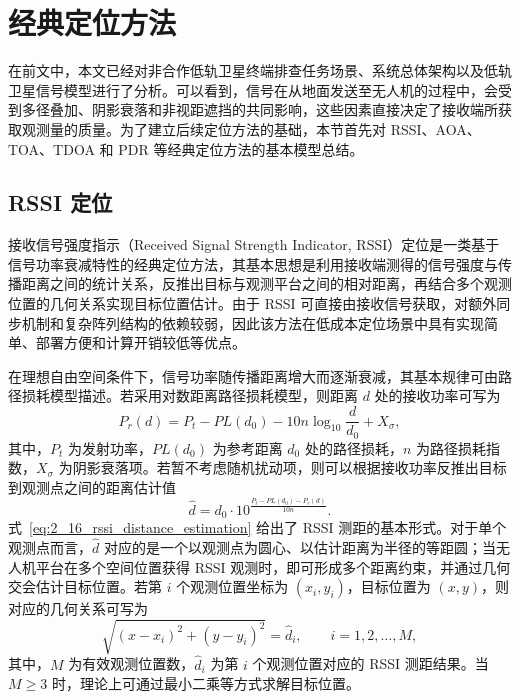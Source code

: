 \section{经典定位方法}
\label{sec:2_3}

在前文中，本文已经对非合作低轨卫星终端排查任务场景、系统总体架构以及低轨卫星信号模型进行了分析。可以看到，信号在从地面发送至无人机的过程中，会受到多径叠加、阴影衰落和非视距遮挡的共同影响，这些因素直接决定了接收端所获取观测量的质量。为了建立后续定位方法的基础，本节首先对 RSSI、AOA、TOA、TDOA 和 PDR 等经典定位方法的基本模型总结\cite{Torrieri1984PassiveLocation,Wymeersch2009CooperativeLocalization}。

\subsection{RSSI 定位}
\label{subsec:2_3_1}

接收信号强度指示（Received Signal Strength Indicator, RSSI）定位是一类基于信号功率衰减特性的经典定位方法，其基本思想是利用接收端测得的信号强度与传播距离之间的统计关系，反推出目标与观测平台之间的相对距离，再结合多个观测位置的几何关系实现目标位置估计。由于 RSSI 可直接由接收信号获取，对额外同步机制和复杂阵列结构的依赖较弱，因此该方法在低成本定位场景中具有实现简单、部署方便和计算开销较低等优点。

在理想自由空间条件下，信号功率随传播距离增大而逐渐衰减，其基本规律可由路径损耗模型描述。若采用对数距离路径损耗模型，则距离 $d$ 处的接收功率可写为
\begin{equation}
P_r(d)
=
P_t
-
PL(d_0)
-
10n\log_{10}\frac{d}{d_0}
+
X_{\sigma},
\label{eq:2_15_rssi_pathloss_model}
\end{equation}
其中，$P_t$ 为发射功率，$PL(d_0)$ 为参考距离 $d_0$ 处的路径损耗，$n$ 为路径损耗指数，$X_{\sigma}$ 为阴影衰落项。若暂不考虑随机扰动项，则可以根据接收功率反推出目标到观测点之间的距离估计值
\begin{equation}
\hat d
=
d_0
\cdot
10^{\frac{P_t-PL(d_0)-P_r(d)}{10n}}.
\label{eq:2_16_rssi_distance_estimation}
\end{equation}
式~\eqref{eq:2_16_rssi_distance_estimation} 给出了 RSSI 测距的基本形式。对于单个观测点而言，$\hat d$ 对应的是一个以观测点为圆心、以估计距离为半径的等距圆；当无人机平台在多个空间位置获得 RSSI 观测时，即可形成多个距离约束，并通过几何交会估计目标位置。若第 $i$ 个观测位置坐标为 $(x_i,y_i)$，目标位置为 $(x,y)$，则对应的几何关系可写为
\begin{equation}
\sqrt{(x-x_i)^2+(y-y_i)^2}
=
\hat d_i,
\qquad i=1,2,\dots,M,
\label{eq:2_17_rssi_geometry_constraint}
\end{equation}
其中，$M$ 为有效观测位置数，$\hat d_i$ 为第 $i$ 个观测位置对应的 RSSI 测距结果。当 $M\geq 3$ 时，理论上可通过最小二乘等方式求解目标位置。


